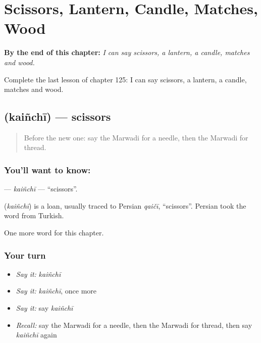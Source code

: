 
\chapter{Scissors, Lantern, Candle, Matches, Wood}
\label{ch:mw-scissors-lantern-candle-matches-wood}

\begin{chapteropening}
\textbf{By the end of this chapter:} \emph{I can say scissors, a lantern, a candle, matches and wood.}

Complete the last lesson of chapter 125: I can say scissors, a lantern, a candle, matches and wood.
\end{chapteropening}

\section[\texorpdfstring{\mw{कैंची} (kaiñchī)}{कैंची (kaiñchī)}]{ (kaiñchī) — scissors}

\label{lesson:MW-C125-kainchi}



\begin{quote}
Before the new one: say the Marwadi for a needle, then the Marwadi for thread.
\end{quote}

\subsection*{You'll want to know: }
\textbf{} — \emph{kaiñchī} — \textquotedblleft{}scissors\textquotedblright{}.

\begin{cousinweb}
\textbf{} (\emph{kaiñchī}) is a loan, usually traced to Persian \emph{qaičī}, \textquotedblleft{}scissors\textquotedblright{}. Persian took the word from Turkish.
\end{cousinweb}

\begin{grammarlens}[title={What you've built}]
One more word for this chapter.
\end{grammarlens}

\subsection*{Your turn}
\begin{itemize}
\raggedright
  \item \emph{Say it:} \emph{kaiñchī}
  \item \emph{Say it:} \emph{kaiñchī}, once more
  \item \emph{Say it:} say \emph{kaiñchī}
  \item \emph{Recall:} say the Marwadi for a needle, then the Marwadi for thread, then say \emph{kaiñchī} again
\end{itemize}

